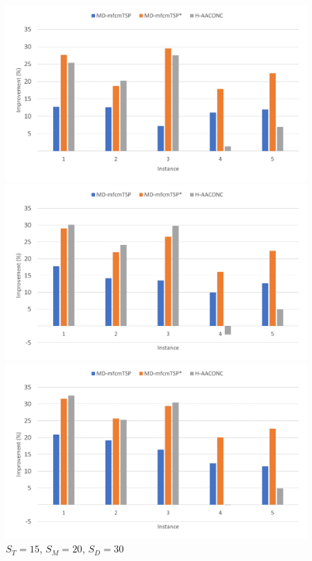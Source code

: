 \documentclass{article}
\begin{document}
	
	\begin{figure}[h]
		\centering
		\begin{minipage}{0.33\textwidth}
			\centering
			\includegraphics[scale=0.42]{large_15-15-15}\;
			\caption{$S_T=15$, $S_M=15$, $S_D=15$}
			\label{fig:large_15-15-15}
		\end{minipage}
		\begin{minipage}{0.33\textwidth}
			\centering
			\includegraphics[scale=0.42]{large_15-20-20}\;
			\caption{$S_T=15$, $S_M=20$, $S_D=20$}
			\label{fig:large_15-20-20}
		\end{minipage}
		\begin{minipage}{0.33\textwidth}
			\centering
			\includegraphics[scale=0.42]{large_15-20-30}\;
			\caption{$S_T=15$, $S_M=20$, $S_D=30$}
			\label{fig:large_15-20-30}
		\end{minipage}
	\end{figure}
	
\end{document}
